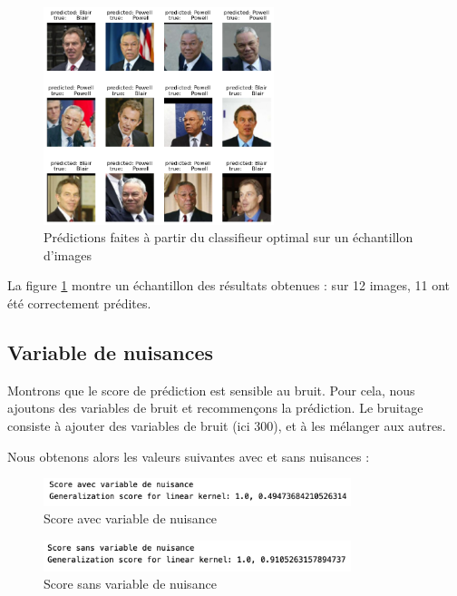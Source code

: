 \documentclass[a4paper,12pt]{article}
\begin{document}
\begin{figure}[H]
    \centering
    \includegraphics[width=0.6\textwidth]{Images/prediction_visage.png}
    \caption{Prédictions faites à partir du classifieur optimal sur un échantillon d'images}\label{fig:predict}
\end{figure}

La figure \ref{fig:predict} montre un échantillon des résultats obtenues : sur 12 images, 11 ont été correctement prédites.

\subsection{Variable de nuisances}

Montrons que le score de prédiction est sensible au bruit. Pour cela, nous ajoutons des variables de bruit et
recommençons la prédiction. Le bruitage consiste à ajouter des variables de bruit (ici 300), et à les mélanger aux autres. 

Nous obtenons alors les valeurs suivantes avec et sans nuisances :

\begin{figure}[H]
    \centering
    \includegraphics[width=0.8\textwidth]{Images/avec_variable.png}
    \caption{Score avec variable de nuisance}\label{fig: avec}
\end{figure}

\begin{figure}[H]
    \centering
    \includegraphics[width=0.8\textwidth]{Images/sans_variable.png}
    \caption{Score sans variable de nuisance}\label{fig: sans}
\end{figure}
\end{document}
